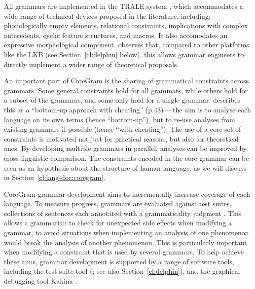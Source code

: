 \documentclass[output=paper,nonflat]{langsci/langscibook}
\begin{document}
All grammars are implemented
in the TRALE system \citep{MPR2002a-u,Penn2004a-u},
which accommodates a wide range of technical devices proposed in the literature, including:
phonologically empty elements,
relational constraints,
implications with complex antecedents,
cyclic feature structures,
and macros.
It also accomodates an expressive morphological component.
\citet{MelnikHandWritten} observes that,
compared to other platforms like the LKB (see Section~\ref{cl:delphin} below),
this allows grammar engineers to directly implement a wider range of theoretical proposals.

An important part of CoreGram is the sharing of grammatical constraints across grammars.
Some general constraints hold for all grammars,
while others hold for a subset of the grammars,
and some only hold for a single grammar.
\citet{MuellerCoreGram} describes this as a
``bottom-up approach with cheating'' (p.43)\,---\,the aim is
to analyse each language on its own terms (hence ``bottom-up''),
but to re-use analyses from existing grammars if possible (hence ``with cheating'').
The use of a core set of constraints is motivated not just for practical reasons,
but also for theoretical ones.
By developing multiple grammars in parallel,
analyses can be improved by cross-linguistic comparison.
The constraints encoded in the core grammar
can be seen as an hypothesis about the structure of human language.
as we will discuss in Section~\ref{cl:lang-doc:coregram}.

CoreGram grammar development aims to incrementally increase coverage of each language.
To measure progress, grammars are evaluated against test suites,
collections of sentences each annotated with a grammaticality judgment \citep{ONK97a,Mueller2004f}.
This allows a grammarian to check for unexpected side effects when modifying a grammar,
to avoid situations when implementing an analysis of one phenomenon
would break the analysis of another phenomenon.
This is particularly important when modifying a constraint that is used by several grammars.
To help achieve these aims, grammar development is supported by a range of software tools,
including the test suite tool \itsdb (\citealp{Oepen:01}; see also Section~\ref{cl:delphin}),
and the graphical debugging tool Kahina \citep{DER2010a-u,DER2013a}.
\end{document}
